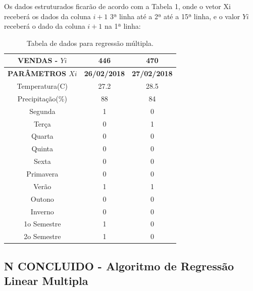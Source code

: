 \documentclass[	12pt, Times, openright, twoside, a4paper, english, brazil]{abntex2}
\begin{document}
          Os dados estruturados ficarão de acordo com a Tabela 1, onde o vetor Xi receberá os dados da coluna $i+1$ 3ª linha até a 2ª até a 15ª linha, e o valor $Yi$ receberá o dado da coluna $i+1$ na 1ª linha:
          \begin{table}[!ht]
          	\centering
          		\caption{Tabela de dados para regressão múltipla.}	\label{tab:regressaoMultipla}
                  
          				\begin{tabular}{|c|c|c|}
          			\hline \textbf{VENDAS - $Yi$}   &\textbf{446} &\textbf{470}\\
          			\hline \textbf{PARÂMETROS $Xi$}   &\textbf{26/02/2018} &\textbf{27/02/2018}\\
          			\hline Temperatura(C)      &27.2 	 			& 28.5\\
          			\hline Precipitação(\%)    & 88         		& 84\\

          			\hline Segunda             & 1          		& 0\\
          			\hline Terça               & 0          		& 1\\
          			\hline Quarta              & 0          		& 0\\
          			\hline Quinta              & 0          		& 0\\
          			\hline Sexta               & 0          		& 0\\

          			\hline Primavera           & 0          		& 0\\
          			\hline Verão               & 1          		& 1\\
          			\hline Outono              & 0          		& 0\\
          			\hline Inverno             & 0          		& 0\\

          			\hline 1o Semestre         & 1          		& 0\\
          			\hline 2o Semestre         & 1          		& 0\\
          		\end{tabular}
          \end{table}

        \subsection{N CONCLUIDO - Algoritmo de Regressão Linear Multipla}
\end{document}
